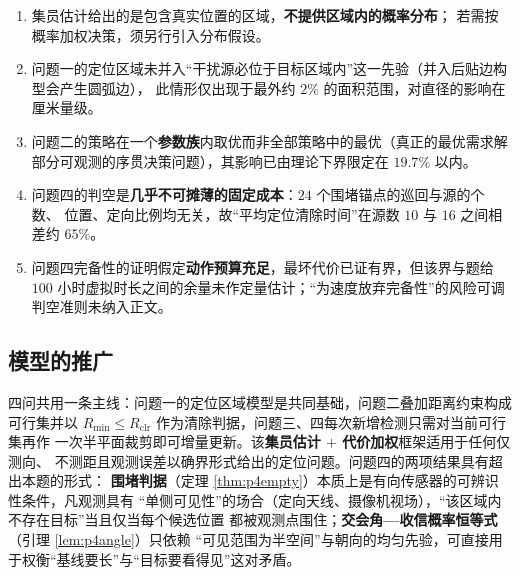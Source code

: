 \documentclass[withoutpreface, bwprint]{cumcmthesis}
\begin{document}
\begin{enumerate}[label=(\arabic*), itemsep=1pt]
  \item 集员估计给出的是包含真实位置的区域，\textbf{不提供区域内的概率分布}；
        若需按概率加权决策，须另行引入分布假设。
  \item 问题一的定位区域未并入“干扰源必位于目标区域内”这一先验（并入后贴边构型会产生圆弧边），
        此情形仅出现于最外约 $2\%$ 的面积范围，对直径的影响在厘米量级。
  \item 问题二的策略在一个\textbf{参数族}内取优而非全部策略中的最优（真正的最优需求解
        部分可观测的序贯决策问题），其影响已由理论下界限定在 $19.7\%$ 以内。
  \item 问题四的判空是\textbf{几乎不可摊薄的固定成本}：$24$ 个围堵锚点的巡回与源的个数、
        位置、定向比例均无关，故“平均定位清除时间”在源数 $10$ 与 $16$ 之间相差约 $65\%$。
  \item 问题四完备性的证明假定\textbf{动作预算充足}，最坏代价已证有界，但该界与题给
        $100$ 小时虚拟时长之间的余量未作定量估计；“为速度放弃完备性”的风险可调判空准则未纳入正文。
\end{enumerate}

\subsection{模型的推广}

四问共用一条主线：问题一的定位区域模型是共同基础，问题二叠加距离约束构成可行集并以
$R_{\min}\le R_{\mathrm{clr}}$ 作为清除判据，问题三、四每次新增检测只需对当前可行集再作
一次半平面裁剪即可增量更新。该\textbf{集员估计 $+$ 代价加权}框架适用于任何仅测向、
不测距且观测误差以确界形式给出的定位问题。问题四的两项结果具有超出本题的形式：
\textbf{围堵判据}（定理 \ref{thm:p4empty}）本质上是有向传感器的可辨识性条件，凡观测具有
“单侧可见性”的场合（定向天线、摄像机视场），“该区域内不存在目标”当且仅当每个候选位置
都被观测点围住；\textbf{交会角—收信概率恒等式}（引理 \ref{lem:p4angle}）只依赖
“可见范围为半空间”与朝向的均匀先验，可直接用于权衡“基线要长”与“目标要看得见”这对矛盾。

%
%
\end{document}
